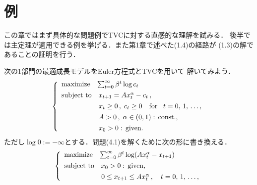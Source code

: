 \documentclass[a4paper,11pt]{jsarticle}
\begin{document}
\vspace{7mm}

\section{例}

この章ではまず具体的な問題例でTVCに対する直感的な理解を試みる．
後半では主定理が適用できる例を挙げる．また第1章で述べた(1.4)の経路が
(1.3)の解であることの証明を行う．

\bigskip

次の1部門の最適成長モデルをEuler方程式とTVCを用いて
解いてみよう．
\belowdisplayskip=4mm
\begin{align}
	\left\{
		\begin{array}{l}
			\mathrm{maximize} \hspace{3mm} \sum_{t=0}^\infty \beta^t \log c_t \vspace{1.4mm}\\
			\mathrm{subject}\hspace{1.2mm}\mathrm{to}\quad x_{t+1}=Ax_t^\alpha-c_t\,,\vspace{1.4mm}\\
			\vspace{1.4mm}
			\hspace{18.9mm}x_t \geq 0\,,\;c_t\geq 0 \quad \mathrm{for}\quad\! t=0,\,1,\,\ldots,\\
			\hspace{18.9mm}A>0 \,,\;\alpha \in (0,1) :\, \mathrm{const.},\vspace{1.4mm}\\
			\hspace{18.9mm}x_0 > 0 :\, \mathrm{given}.
		\end{array}
        \right.
\end{align}
ただし$\log 0:=-\infty$とする．問題(4.1)を解くために次の形に書き換える．
\belowdisplayskip=3.2mm
\begin{align*}
	\left\{
		\begin{array}{l}
			\mathrm{maximize} \hspace{3mm} \sum_{t=0}^\infty \beta^t \log (Ax_t^\alpha-x_{t+1}) \vspace{1.4mm}\\
			\mathrm{subject}\hspace{1.2mm}\mathrm{to}\quad x_0 > 0 :\, \mathrm{given},
			\vspace{1.4mm}\\
			\hspace{18.9mm}0\leq x_{t+1} \leq Ax_t^\alpha \,,\quad t=0,\,1,\,\ldots,
		\end{array}
        \right.
\end{align*}
\end{document}
